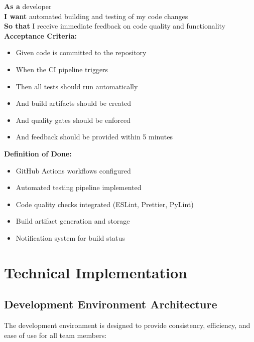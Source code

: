 \begin{tcolorbox}[colback=lightgray, colframe=primaryblue, title=US-1.3: Automated Build Pipeline]
\textbf{As a} developer \\
\textbf{I want} automated building and testing of my code changes \\
\textbf{So that} I receive immediate feedback on code quality and functionality \\

\textbf{Acceptance Criteria:}
\begin{itemize}
    \item Given code is committed to the repository
    \item When the CI pipeline triggers
    \item Then all tests should run automatically
    \item And build artifacts should be created
    \item And quality gates should be enforced
    \item And feedback should be provided within 5 minutes
\end{itemize}

\textbf{Definition of Done:}
\begin{itemize}
    \item GitHub Actions workflows configured
    \item Automated testing pipeline implemented
    \item Code quality checks integrated (ESLint, Prettier, PyLint)
    \item Build artifact generation and storage
    \item Notification system for build status
\end{itemize}
\end{tcolorbox}

\section{Technical Implementation}

\subsection{Development Environment Architecture}

The development environment is designed to provide consistency, efficiency, and ease of use for all team members:

